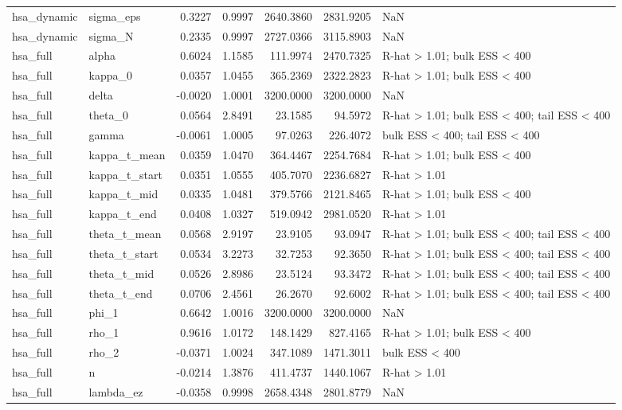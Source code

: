 \begin{tabular}{llrrrrl}
hsa\_dynamic & sigma\_eps & 0.3227 & 0.9997 & 2640.3860 & 2831.9205 & NaN \\
hsa\_dynamic & sigma\_N & 0.2335 & 0.9997 & 2727.0366 & 3115.8903 & NaN \\
hsa\_full & alpha & 0.6024 & 1.1585 & 111.9974 & 2470.7325 & R-hat > 1.01; bulk ESS < 400 \\
hsa\_full & kappa\_0 & 0.0357 & 1.0455 & 365.2369 & 2322.2823 & R-hat > 1.01; bulk ESS < 400 \\
hsa\_full & delta & -0.0020 & 1.0001 & 3200.0000 & 3200.0000 & NaN \\
hsa\_full & theta\_0 & 0.0564 & 2.8491 & 23.1585 & 94.5972 & R-hat > 1.01; bulk ESS < 400; tail ESS < 400 \\
hsa\_full & gamma & -0.0061 & 1.0005 & 97.0263 & 226.4072 & bulk ESS < 400; tail ESS < 400 \\
hsa\_full & kappa\_t\_mean & 0.0359 & 1.0470 & 364.4467 & 2254.7684 & R-hat > 1.01; bulk ESS < 400 \\
hsa\_full & kappa\_t\_start & 0.0351 & 1.0555 & 405.7070 & 2236.6827 & R-hat > 1.01 \\
hsa\_full & kappa\_t\_mid & 0.0335 & 1.0481 & 379.5766 & 2121.8465 & R-hat > 1.01; bulk ESS < 400 \\
hsa\_full & kappa\_t\_end & 0.0408 & 1.0327 & 519.0942 & 2981.0520 & R-hat > 1.01 \\
hsa\_full & theta\_t\_mean & 0.0568 & 2.9197 & 23.9105 & 93.0947 & R-hat > 1.01; bulk ESS < 400; tail ESS < 400 \\
hsa\_full & theta\_t\_start & 0.0534 & 3.2273 & 32.7253 & 92.3650 & R-hat > 1.01; bulk ESS < 400; tail ESS < 400 \\
hsa\_full & theta\_t\_mid & 0.0526 & 2.8986 & 23.5124 & 93.3472 & R-hat > 1.01; bulk ESS < 400; tail ESS < 400 \\
hsa\_full & theta\_t\_end & 0.0706 & 2.4561 & 26.2670 & 92.6002 & R-hat > 1.01; bulk ESS < 400; tail ESS < 400 \\
hsa\_full & phi\_1 & 0.6642 & 1.0016 & 3200.0000 & 3200.0000 & NaN \\
hsa\_full & rho\_1 & 0.9616 & 1.0172 & 148.1429 & 827.4165 & R-hat > 1.01; bulk ESS < 400 \\
hsa\_full & rho\_2 & -0.0371 & 1.0024 & 347.1089 & 1471.3011 & bulk ESS < 400 \\
hsa\_full & n & -0.0214 & 1.3876 & 411.4737 & 1440.1067 & R-hat > 1.01 \\
hsa\_full & lambda\_ez & -0.0358 & 0.9998 & 2658.4348 & 2801.8779 & NaN \\

\end{tabular}
